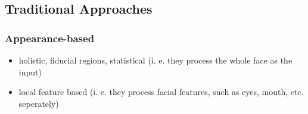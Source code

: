 \documentclass[paper=a4, fontsize=11pt]{scrartcl} %
\numberwithin{equation}{section} %
\numberwithin{figure}{section} %
\numberwithin{table}{section} %
\begin{document}
\subsection{Traditional Approaches}

\subsubsection{Appearance-based}

\begin{itemize}
\item holistic, fiducial regions, statistical (i. e. they process the whole face as the input)
\item local feature based (i. e. they process facial features, such as eyes, mouth, etc. seperately)
\end{itemize}
\end{document}
